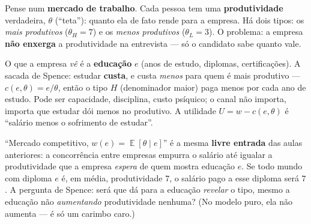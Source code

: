 \documentclass[11pt,a4paper]{article}
\DeclareMathOperator{\Esp}{\mathbb{E}}
\begin{document}
\begin{empalavras}
Pense num \textbf{mercado de trabalho}. Cada pessoa tem uma \textbf{produtividade}
verdadeira, $\theta$ (``teta''): quanto ela de fato rende para a empresa. Há dois tipos: os
\emph{mais produtivos} ($\theta_H=7$) e os \emph{menos produtivos} ($\theta_L=3$). O problema:
a empresa \textbf{não enxerga} a produtividade na entrevista — só o candidato sabe quanto vale.

\smallskip\noindent
O que a empresa \emph{vê} é a \textbf{educação} $e$ (anos de estudo, diplomas, certificações).
A sacada de Spence: estudar \textbf{custa}, e custa \emph{menos} para quem é mais produtivo —
$c(e,\theta)=e/\theta$, então o tipo $H$ (denominador maior) paga menos por cada ano de estudo.
Pode ser capacidade, disciplina, custo psíquico; o canal não importa, importa que estudar dói
menos no produtivo. A utilidade $U=w-c(e,\theta)$ é ``salário menos o sofrimento de estudar''.

\smallskip\noindent
``Mercado competitivo, $w(e)=\Esp[\theta\mid e]$'' é a mesma \textbf{livre entrada} das aulas
anteriores: a concorrência entre empresas empurra o salário até igualar a produtividade que a
empresa \emph{espera} de quem mostra educação $e$. Se todo mundo com diploma $e$ é, em média,
produtividade $7$, o salário pago a esse diploma será $7$. A pergunta de Spence: será que dá
para a educação \emph{revelar} o tipo, mesmo a educação não \emph{aumentando} produtividade
nenhuma? (No modelo puro, ela não aumenta — é só um carimbo caro.)
\end{empalavras}
\end{document}
